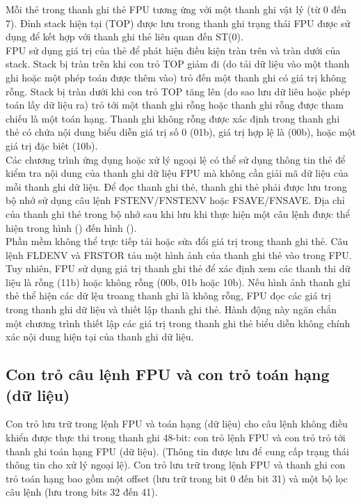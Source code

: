 	Mỗi thẻ trong thanh ghi thẻ FPU tương ứng với một thanh ghi vật lý (từ 0 đến 7). Đỉnh stack hiện tại (TOP) được lưu trong thanh ghi trạng thái FPU được sử dụng để kết hợp với thanh ghi thẻ liên quan đến ST(0). \\
	
	FPU sử dụng giá trị của thẻ để phát hiện điều kiện tràn trên và tràn dưới của stack. Stack bị tràn trên khi con trỏ TOP giảm đi (do tải dữ liệu vào một thanh ghi hoặc một phép toán được thêm vào) trỏ đến một thanh ghi có giá trị không rỗng. Stack bị tràn dưới khi con trỏ TOP tăng lên (do sao lưu dữ liêu hoặc phép toán lấy dữ liệu ra) trỏ tới một thanh ghi rỗng hoặc thanh ghi rỗng được tham chiếu là một toán hạng. Thanh ghi không rỗng được xác định trong thanh ghi thẻ có chứa nội dung biểu diễn giá trị số 0 (01b), giá trị hợp lệ là (00b), hoặc một giá trị đặc biêt (10b).\\
	
	Các chương trình ứng dụng hoặc xử lý ngoại lệ có thể sử dụng thông tin thẻ để kiểm tra nội dung của thanh ghi dữ liệu FPU mà không cần giải mã dữ liệu của mỗi thanh ghi dữ liệu. Để đọc thanh ghi thẻ, thanh ghi thẻ phải được lưu trong bộ nhớ sử dụng câu lệnh FSTENV/FNSTENV hoặc FSAVE/FNSAVE.  Địa chỉ của thanh ghi thẻ trong bộ nhớ sau khi lưu khi thực hiện một câu lệnh được thể hiện trong hình () đến hình (). \\
	
	Phần mềm không thể trực tiếp tải hoặc sửa đổi giá trị trong thanh ghi thẻ. Câu lệnh FLDENV và FRSTOR tảu một hình ảnh của thanh ghi thẻ vào trong FPU. Tuy nhiên, FPU sử dụng giá trị thanh ghi thẻ để xác định xem các thanh thi dữ liệu là rỗng (11b) hoặc không rỗng (00b, 01b hoặc 10b). Nếu hình ảnh thanh ghi thẻ thể hiện các dữ lệu troang thanh ghi là không rỗng, FPU đọc các giá trị trong thanh ghi dữ liệu và thiết lập thanh ghi thẻ. Hành động này ngăn chẳn một chương trình thiết lập các giá trị trong thanh ghi thẻ biểu diễn không chính xác nội dung hiện tại của thanh ghi dữ liệu.
	
		\subsection*{Con trỏ câu lệnh FPU và con trỏ toán hạng (dữ liệu)}
	Con trỏ lưu trữ trong lệnh FPU và toán hạng (dữ liệu) cho câu lệnh không điều khiển được thực thi trong thanh ghi 48-bit: con trỏ lệnh FPU và con trỏ trỏ tới thanh ghi toán hạng FPU (dữ liệu). (Thông tin được lưu để cung cấp trạng thái thông tin cho xử lý ngoại lệ). 	Con trỏ lưu trữ trong lệnh FPU và thanh ghi con trỏ toán hạng bao gồm một offset (lưu trữ trong bit 0 đến bit 31) và một bộ lọc câu lệnh (lưu trong bits 32 đến 41).\\
	
